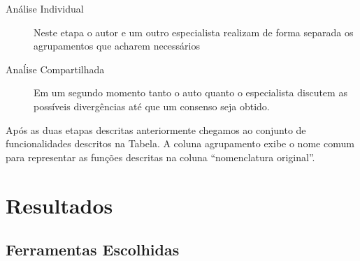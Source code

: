 \begin{description}
	\item[Análise Individual] Neste etapa o autor e um outro especialista
		realizam de forma separada os agrupamentos que acharem necessários
	\item[Anaĺise Compartilhada] Em um segundo momento tanto o auto quanto o
		especialista discutem as possíveis divergências até que um consenso seja
		obtido.
\end{description}

Após as duas etapas descritas anteriormente chegamos ao conjunto de
funcionalidades descritos na Tabela. A coluna agrupamento exibe o nome comum
para representar as funções descritas na coluna ``nomenclatura original''.

\section{Resultados}
\label{sec:resultados}

\subsection{Ferramentas Escolhidas}
\label{subsec:resultados_ferramentas_escolhidas}


\begin{table}[htb]
\centering
\caption{Ferramentas utilizados no estudo}
\label{tab:ferramenta_utilizadas_estudo}
\end{table}


